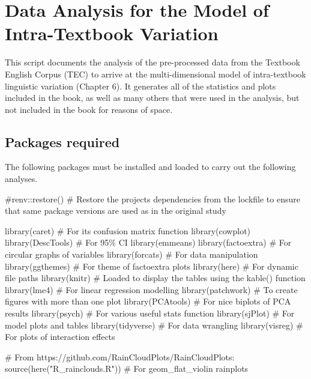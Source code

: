 \documentclass[
  letterpaper,
  DIV=11,
  numbers=noendperiod]{scrreprt}
\newenvironment{Shaded}{\begin{snugshade}}{\end{snugshade}}
\newcommand{\CommentTok}[1]{\textcolor[rgb]{0.37,0.37,0.37}{#1}}
\newcommand{\FunctionTok}[1]{\textcolor[rgb]{0.28,0.35,0.67}{#1}}
\newcommand{\NormalTok}[1]{\textcolor[rgb]{0.00,0.23,0.31}{#1}}
\newcommand{\StringTok}[1]{\textcolor[rgb]{0.13,0.47,0.30}{#1}}
\begin{document}
\chapter{Data Analysis for the Model of Intra-Textbook
Variation}\label{data-analysis-for-the-model-of-intra-textbook-variation}

This script documents the analysis of the pre-processed data from the
Textbook English Corpus (TEC) to arrive at the multi-dimensional model
of intra-textbook linguistic variation (Chapter 6). It generates all of
the statistics and plots included in the book, as well as many others
that were used in the analysis, but not included in the book for reasons
of space.

\section{Packages required}\label{packages-required-2}

The following packages must be installed and loaded to carry out the
following analyses.

\begin{Shaded}
\begin{Highlighting}[]
\CommentTok{\#renv::restore() \# Restore the project\textquotesingle{}s dependencies from the lockfile to ensure that same package versions are used as in the original study}

\FunctionTok{library}\NormalTok{(caret) }\CommentTok{\# For its confusion matrix function}
\FunctionTok{library}\NormalTok{(cowplot)}
\FunctionTok{library}\NormalTok{(DescTools) }\CommentTok{\# For 95\% CI}
\FunctionTok{library}\NormalTok{(emmeans)}
\FunctionTok{library}\NormalTok{(factoextra) }\CommentTok{\# For circular graphs of variables}
\FunctionTok{library}\NormalTok{(forcats) }\CommentTok{\# For data manipulation}
\FunctionTok{library}\NormalTok{(ggthemes) }\CommentTok{\# For theme of factoextra plots}
\FunctionTok{library}\NormalTok{(here) }\CommentTok{\# For dynamic file paths}
\FunctionTok{library}\NormalTok{(knitr) }\CommentTok{\# Loaded to display the tables using the kable() function}
\FunctionTok{library}\NormalTok{(lme4) }\CommentTok{\# For linear regression modelling}
\FunctionTok{library}\NormalTok{(patchwork) }\CommentTok{\# To create figures with more than one plot}
\FunctionTok{library}\NormalTok{(PCAtools) }\CommentTok{\# For nice biplots of PCA results}
\FunctionTok{library}\NormalTok{(psych) }\CommentTok{\# For various useful stats function}
\FunctionTok{library}\NormalTok{(sjPlot) }\CommentTok{\# For model plots and tables}
\FunctionTok{library}\NormalTok{(tidyverse) }\CommentTok{\# For data wrangling}
\FunctionTok{library}\NormalTok{(visreg) }\CommentTok{\# For plots of interaction effects}

\CommentTok{\# From https://github.com/RainCloudPlots/RainCloudPlots:}
\FunctionTok{source}\NormalTok{(}\FunctionTok{here}\NormalTok{(}\StringTok{"R\_rainclouds.R"}\NormalTok{)) }\CommentTok{\# For geom\_flat\_violin rainplots}
\end{Highlighting}
\end{Shaded}
\end{document}

